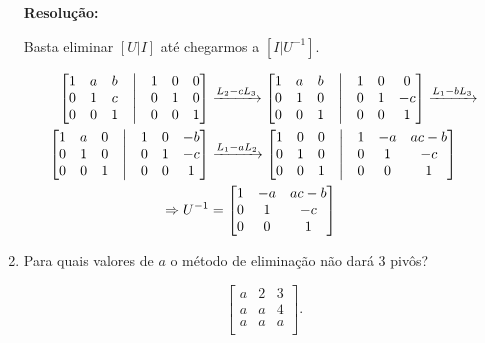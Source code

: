 \documentclass[leqno]{article}
\begin{document}
\begin{enumerate}
    \textbf{Resolução:}

    Basta eliminar $[U|I]$ até chegarmos a $[I|U^{-1}]$.
    
    \begin{align*}
    \begin{bmatrix}
    1 & a & b & \bigm| & 1 & 0 & 0\\
    0 & 1 & c & \bigm| & 0 & 1 & 0\\
    0 & 0 & 1 & \bigm| & 0 & 0 & 1\\
    \end{bmatrix}&\xrightarrow{L_2-cL_3}\begin{bmatrix}
    1 & a & b & \bigm| & 1 & 0 & 0\\
    0 & 1 & 0 & \bigm| & 0 & 1 & -c\\
    0 & 0 & 1 & \bigm| & 0 & 0 & 1\\
    \end{bmatrix}\xrightarrow{L_1-bL_3}\\\begin{bmatrix}
    1 & a & 0 & \bigm| & 1 & 0 & -b\\
    0 & 1 & 0 & \bigm| & 0 & 1 & -c\\
    0 & 0 & 1 & \bigm| & 0 & 0 & 1\\
    \end{bmatrix}&\xrightarrow{L_1-aL_2}\begin{bmatrix}
    1 & 0 & 0 & \bigm| & 1 & -a & ac-b\\
    0 & 1 & 0 & \bigm| & 0 & 1 & -c\\
    0 & 0 & 1 & \bigm| & 0 & 0 & 1\\
    \end{bmatrix}\\
    \Rightarrow U^{-1}&=\begin{bmatrix}
    1 & -a & ac-b\\
    0 & 1 & -c\\
    0 & 0 & 1\\
    \end{bmatrix}
    \end{align*}
    
    \item Para quais valores de $a$ o método de eliminação não dará $3$ pivôs?
    
    $$\begin{bmatrix}
    a & 2 & 3\\
    a & a & 4\\
    a & a & a\\
    \end{bmatrix}\text{.}$$
    

\end{enumerate}
\end{document}
